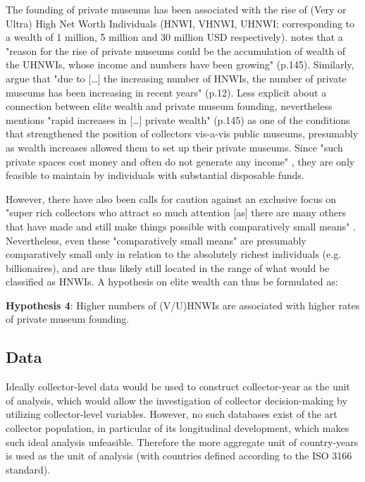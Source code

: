 \documentclass[11pt]{article}
\begin{document}
The founding of private museums has been associated with the rise of (Very or Ultra) High Net Worth Individuals (HNWI, VHNWI, UHNWI; corresponding to a wealth of 1 million, 5 million and 30 million USD respectively).
\textcite{Gnyp_2015_collectors} notes that a "reason for the rise of private museums could be the accumulation
of wealth of the UHNWIs, whose income and numbers have been growing" (p.145).
Similarly, \textcite{Zorloni_Resch_2016_opportunities} argue that "due to [\ldots{}] the increasing number of HNWIs, the number of private museums has been increasing in recent years" (p.12).
Less explicit about a connection between elite wealth and private museum founding, \textcite{Walker_2019_collector} nevertheless mentions "rapid increases in [\ldots{}] private wealth" (p.145) as one of the conditions that strengthened the position of collectors vis-a-vis public museums, presumably as wealth increases allowed them to set up their private museums. 
Since "such private spaces cost money and often do not generate any income" \parencite[p.145]{Gnyp_2015_collectors}, they are only feasible to maintain by individuals with substantial disposable funds. 



However, there have also been calls for caution against an exclusive focus on "super rich collectors who attract so much attention [as] there are many others that have made and still make things possible with comparatively small means" \parencite[p.12]{Bechtler_Imhof_2018_future}.
Nevertheless, even these "comparatively small means" are presumably comparatively small only in relation to the absolutely richest individuals (e.g. billionaires), and are thus likely still located in the range of what would be classified as HNWIs.
A hypothesis on elite wealth can thus be formulated as: 

\bigbreak
\noindent
\textbf{Hypothesis 4}: Higher numbers of (V/U)HNWIs are associated with higher rates of private museum founding.




\subsection*{Data}


Ideally collector-level data would be used to construct collector-year as the unit of analysis, which would allow the investigation of collector decision-making by utilizing collector-level variables. 
However, no such databases exist of the art collector population, in particular of its longitudinal development, which makes such ideal analysis unfeasible. 
Therefore the more aggregate unit of country-years is used as the unit of analysis (with countries defined according to the ISO 3166 standard). 
\end{document}
